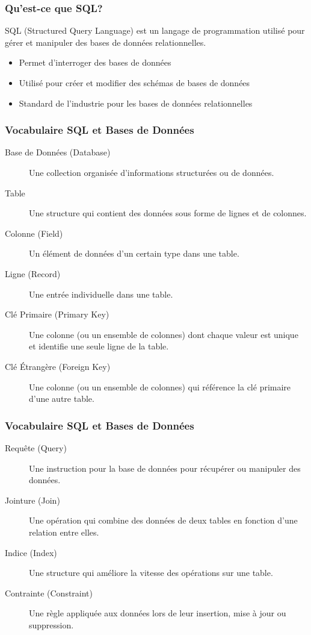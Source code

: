 \begin{frame}
  \frametitle{Qu'est-ce que SQL?}

  SQL (Structured Query Language) est un langage de programmation utilisé pour gérer et manipuler des bases de données relationnelles.

  \begin{itemize}
      \item Permet d'interroger des bases de données
      \item Utilisé pour créer et modifier des schémas de bases de données
      \item Standard de l'industrie pour les bases de données relationnelles
  \end{itemize}
\end{frame}

\begin{frame}
  \frametitle{Vocabulaire SQL et Bases de Données}

  \begin{description}
    \item[Base de Données (Database)] Une collection organisée d'informations structurées ou de données.
    \item[Table] Une structure qui contient des données sous forme de lignes et de colonnes.
    \item[Colonne (Field)] Un élément de données d'un certain type dans une table.
    \item[Ligne (Record)] Une entrée individuelle dans une table.
    \item[Clé Primaire (Primary Key)] Une colonne (ou un ensemble de colonnes) dont chaque valeur est unique et identifie une seule ligne de la table.
    \item[Clé Étrangère (Foreign Key)] Une colonne (ou un ensemble de colonnes) qui référence la clé primaire d'une autre table.
  \end{description}

\end{frame}

\begin{frame}
  \frametitle{Vocabulaire SQL et Bases de Données}

  \begin{description}
    \item[Requête (Query)] Une instruction pour la base de données pour récupérer ou manipuler des données.
    \item[Jointure (Join)] Une opération qui combine des données de deux tables en fonction d'une relation entre elles.
    \item[Indice (Index)] Une structure qui améliore la vitesse des opérations sur une table.
    \item[Contrainte (Constraint)] Une règle appliquée aux données lors de leur insertion, mise à jour ou suppression.
  \end{description}

\end{frame}



